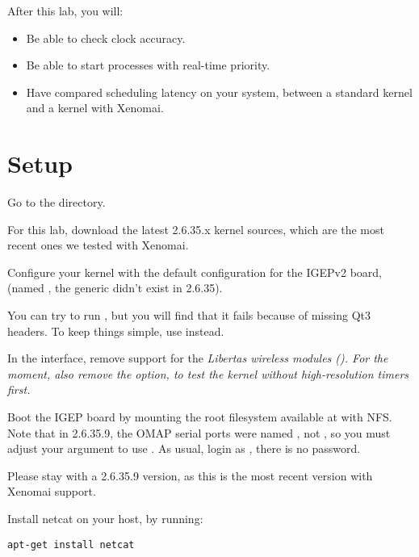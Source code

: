 
After this lab, you will:
\begin{itemize}
\item Be able to check clock accuracy.
\item Be able to start processes with real-time priority.
\item Have compared scheduling latency on your system, between a standard kernel and a kernel with Xenomai.
\end{itemize}

\section{Setup}

Go to the  directory.

For this lab, download the latest 2.6.35.x kernel sources, which 
are the most recent ones we tested with Xenomai.

Configure your kernel with the default configuration for the IGEPv2
board, (named , the generic 
didn't exist in 2.6.35).

You can try to run , but you will find that
it fails because of missing Qt3 headers. To keep things simple, use 
 instead. 

In the  interface, remove support for the 
\em{Libertas} wireless modules (). 
For the moment, also remove the 
option, to test the kernel without high-resolution timers first.

Boot the IGEP board by mounting the root filesystem available at
 with NFS. Note
that in 2.6.35.9, the OMAP serial ports were named , not
, so you must adjust your  argument to use
. As usual, login as , there is no password.

Please stay with a 2.6.35.9 version, as this is the most recent
version with Xenomai support.

Install netcat on your host, by running:
\begin{verbatim}
apt-get install netcat
\end{verbatim}

